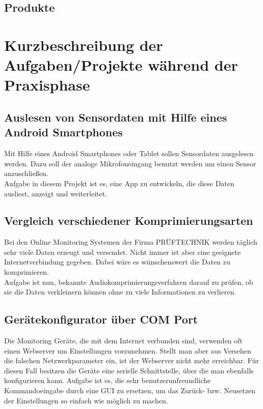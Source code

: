 \documentclass{article}
\begin{document}
{	\subsection{Produkte}


\section{Kurzbeschreibung der Aufgaben/Projekte während der Praxisphase}
	\subsection{Auslesen von Sensordaten mit Hilfe eines Android Smartphones} 

		Mit Hilfe eines Android Smartphones oder Tablet sollen Sensordaten ausgelesen werden. Dazu soll der analoge Mikrofoneingang benutzt werden um einen Sensor anzuschließen.\\
		Aufgabe in diesem Projekt ist es, eine App zu entwickeln, die diese Daten ausliest, anzeigt und weiterleitet.

	\subsection{Vergleich verschiedener Komprimierungsarten} 

		Bei den Online Monitoring Systemen der Firma PRÜFTECHNIK werden täglich sehr viele Daten erzeugt und versendet. Nicht immer ist aber eine geeignete Internetverbindung gegeben. Dabei wäre es wünschenswert die Daten zu komprimieren.\\
		Aufgabe ist nun, bekannte Audiokomprimierungsverfahren darauf zu prüfen, ob sie die Daten verkleinern können ohne zu viele Informationen zu verlieren.

	\subsection{Gerätekonfigurator über COM Port} 

		Die Monitoring Geräte, die mit dem Internet verbunden sind, verwenden oft einen Webserver um Einstellungen vorzunehmen. Stellt man aber aus Versehen die falschen Netzwerkparameter ein, ist der Webserver nicht mehr erreichbar. Für diesen Fall besitzen die Geräte eine serielle Schnittstelle, über die man ebenfalls konfigurieren kann. Aufgabe ist es, die sehr benutzerunfreundliche Kommandoeingabe durch eine GUI zu ersetzen, um das Zurück- bzw. Neusetzen der Einstellungen so einfach wie möglich zu machen.

}
\end{document}
